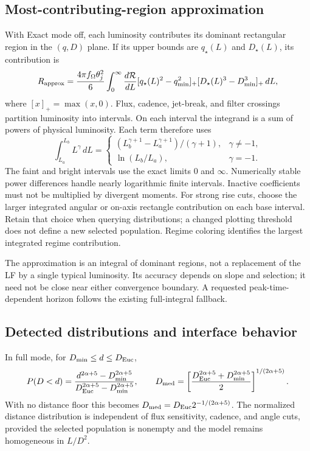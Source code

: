 \documentclass[11pt,a4paper]{article}
\begin{document}
\subsection{Most-contributing-region approximation}

With Exact mode off, each luminosity contributes its dominant rectangular
region in the $(q,D)$ plane. If its upper bounds are
$q_\star(L)$ and $D_\star(L)$, its contribution is
\begin{equation}
 R_{\rm approx}=\frac{4\pi f_\Omega\theta_j^2}{6}
 \int_0^\infty \frac{d\mathcal R}{dL}
 [q_\star(L)^2-q_{\rm min}^2]_+
 [D_\star(L)^3-D_{\rm min}^3]_+\,dL,
 \label{eq:lf_rectangle}
\end{equation}
where $[x]_+=\max(x,0)$. Flux, cadence, jet-break, and filter crossings
partition luminosity into intervals. On each interval the integrand is a
sum of powers of physical luminosity. Each term therefore uses
\[
 \int_{L_a}^{L_b}L^\gamma\,dL=
 \begin{cases}
 (L_b^{\gamma+1}-L_a^{\gamma+1})/(\gamma+1),&\gamma\ne-1,\\
 \ln(L_b/L_a),&\gamma=-1.
 \end{cases}
\]
The faint and bright intervals use the exact limits $0$ and $\infty$.
Numerically stable power differences handle nearly logarithmic finite
intervals. Inactive coefficients must not be multiplied by divergent moments.
For strong rise cuts, choose the larger integrated angular or on-axis
rectangle contribution on each base interval. Retain that choice when
querying distributions; a changed plotting threshold does not define a new
selected population. Regime coloring identifies the largest integrated
regime contribution.

The approximation is an integral of dominant regions, not a replacement of
the LF by a single typical luminosity. Its accuracy depends on slope and
selection; it need not be close near either convergence boundary. A requested
peak-time-dependent horizon follows the existing full-integral fallback.

\subsection{Detected distributions and interface behavior}

In full mode, for $D_{\rm min}\le d\le D_{\rm Euc}$,
\begin{equation}
 P(D<d)=\frac{d^{2\alpha+5}-D_{\rm min}^{2\alpha+5}}
 {D_{\rm Euc}^{2\alpha+5}-D_{\rm min}^{2\alpha+5}},\qquad
 D_{\rm med}=\left[\frac{D_{\rm Euc}^{2\alpha+5}
 +D_{\rm min}^{2\alpha+5}}2\right]^{1/(2\alpha+5)}.
\end{equation}
With no distance floor this becomes
$D_{\rm med}=D_{\rm Euc}2^{-1/(2\alpha+5)}$.
The normalized distance distribution is independent of flux sensitivity,
cadence, and angle cuts, provided the selected population is nonempty and the
model remains homogeneous in $L/D^2$.
\end{document}
